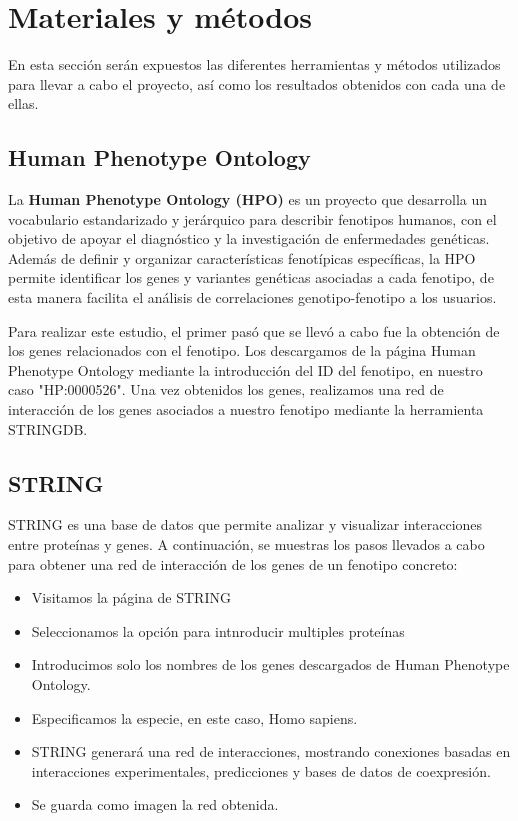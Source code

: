 \section{Materiales y métodos}

En esta sección serán expuestos las diferentes herramientas y métodos utilizados para llevar a cabo el proyecto, así como los resultados obtenidos con cada una de ellas.

\subsection{Human Phenotype Ontology}

La \textbf{Human Phenotype Ontology (HPO)} es un proyecto que desarrolla un vocabulario estandarizado y jerárquico para describir fenotipos humanos, con el objetivo de apoyar el diagnóstico y la investigación de enfermedades genéticas. Además de definir y organizar características fenotípicas específicas, la HPO permite identificar los genes y variantes genéticas asociadas a cada fenotipo, de esta manera facilita el análisis de correlaciones genotipo-fenotipo a los usuarios.

Para realizar este estudio, el primer pasó que se llevó a cabo fue la obtención de los genes relacionados con el fenotipo. Los descargamos de la página Human Phenotype Ontology mediante la introducción del ID del fenotipo, en nuestro caso "HP:0000526". Una vez obtenidos los genes, realizamos una red de interacción de los genes asociados a nuestro fenotipo mediante la herramienta STRINGDB.
 

\subsection{STRING}


STRING es una base de datos que permite analizar y visualizar interacciones entre proteínas y genes. A continuación, se muestras los pasos llevados a cabo para obtener una red de interacción de los genes de un fenotipo concreto:

\begin{itemize}
	\item Visitamos la página de STRING
	\item Seleccionamos la opción para intnroducir multiples proteínas
	\item Introducimos solo los nombres de los genes descargados de Human Phenotype Ontology.
	\item Especificamos la especie, en este caso, Homo sapiens.
	\item STRING generará una red de interacciones, mostrando conexiones basadas en interacciones experimentales, predicciones y bases de datos de coexpresión.
	\item Se guarda como imagen la red obtenida.
\end{itemize}

